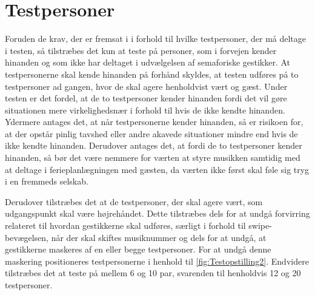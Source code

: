 \section{Testpersoner}
\label{TestpersonerSocialAccept}
%
Foruden de krav, der er fremsat i  i forhold til hvilke testpersoner, der må deltage i testen, så tilstræbes det kun at teste på personer, som i forvejen kender hinanden og som ikke har deltaget i udvælgelsen af semaforiske gestikker. At testpersonerne skal kende hinanden på forhånd skyldes, at testen udføres på to testpersoner ad gangen, hvor de skal agere henholdvist vært og gæst. Under testen er det fordel, at de to testpersoner kender hinanden fordi det vil gøre situationen mere virkelighedsnær i forhold til hvis de ikke kendte hinanden. Ydermere antages det, at når testpersonerne kender hinanden, så er risikoen for, at der opstår pinlig tavshed eller andre akavede situationer mindre end hvis de ikke kendte hinanden. Derudover antages det, at fordi de to testpersoner kender hinanden, så bør det være nemmere for værten at styre musikken samtidig med at deltage i ferieplanlægningen med gæsten, da værten ikke først skal føle sig tryg i en fremmeds selskab. 

Derudover tilstræbes det at de testpersoner, der skal agere vært, som udgangspunkt skal være højrehåndet. Dette tilstræbes dels for at undgå forvirring relateret til hvordan gestikkerne skal udføres, særligt i forhold til swipe-bevægelsen, når der skal skiftes musiknummer og dels for at undgå, at gestikkerne maskeres af en eller begge testpersoner. For at undgå denne maskering positioneres testpersonerne i henhold til \autoref{fig:Testopstilling2}. Endvidere tilstræbes det at teste på mellem 6 og 10 par, svarenden til henholdvis 12 og 20 testpersoner. 